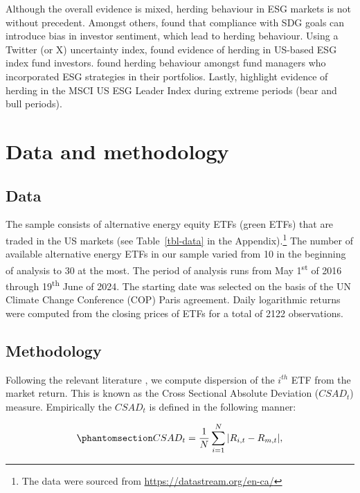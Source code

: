 \documentclass[
  letterpaper,
  DIV=11,
  numbers=noendperiod]{scrartcl}
\begin{document}
Although the overall evidence is mixed, herding behaviour in ESG markets
is not without precedent. Amongst others, \citet{loang2023} found that
compliance with SDG goals can introduce bias in investor sentiment,
which lead to herding behaviour. Using a Twitter (or X) uncertainty
index, \citet{koutmos2024} found evidence of herding in US-based ESG
index fund investors. \citet{przychodzen2016} found herding behaviour
amongst fund managers who incorporated ESG strategies in their
portfolios. Lastly, \citet{rubbaniy2021} highlight evidence of herding
in the MSCI US ESG Leader Index during extreme periods (bear and bull
periods).

\section{Data and methodology}\label{data-and-methodology}

\subsection{Data}\label{data}

The sample consists of alternative energy equity ETFs (green ETFs) that
are traded in the US markets (see Table~\ref{tbl-data} in the
Appendix).\footnote{The data were sourced from
  \url{https://datastream.org/en-ca/}} The number of available
alternative energy ETFs in our sample varied from 10 in the beginning of
analysis to 30 at the most. The period of analysis runs from May
1\textsuperscript{st} of 2016 through 19\textsuperscript{th} June of
2024. The starting date was selected on the basis of the UN Climate
Change Conference (COP) Paris agreement. Daily logarithmic returns were
computed from the closing prices of ETFs for a total of 2122
observations.

\subsection{Methodology}\label{methodology}

Following the relevant literature
\citetext{\citealp{christie1995}; \citealp[and][]{chang2000}}, we
compute dispersion of the \(i^{th}\) ETF from the market return. This is
known as the Cross Sectional Absolute Deviation (\(CSAD_t\)) measure.
Empirically the \(CSAD_t\) is defined in the following manner:

\begin{equation}\phantomsection\label{eq-csad}{
CSAD_t = \dfrac{1}{N}\sum_{i=1}^{N} |R_{i,t} - R_{m,t}|,
}\end{equation}
\end{document}
